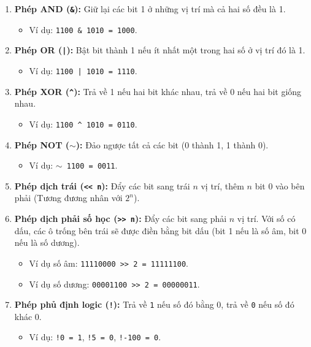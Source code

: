 \documentclass[12pt, a4paper]{article}
\begin{document}
\begin{enumerate}
    \item \textbf{Phép AND (\texttt{\&}):} Giữ lại các bit 1 ở những vị trí mà cả hai số đều là 1.
    \begin{itemize}
        \item Ví dụ: \texttt{1100 \& 1010 = 1000}.
    \end{itemize}
    \item \textbf{Phép OR (\texttt{|}):} Bật bit thành 1 nếu ít nhất một trong hai số ở vị trí đó là 1.
    \begin{itemize}
        \item Ví dụ: \texttt{1100 | 1010 = 1110}.
    \end{itemize}
    \item \textbf{Phép XOR (\texttt{\textasciicircum}):} Trả về 1 nếu hai bit khác nhau, trả về 0 nếu hai bit giống nhau.
    \begin{itemize}
        \item Ví dụ: \texttt{1100 \textasciicircum\ 1010 = 0110}.
    \end{itemize}
    \item \textbf{Phép NOT (\texttt{\(\sim\)}):} Đảo ngược tất cả các bit (0 thành 1, 1 thành 0).
    \begin{itemize}
        \item Ví dụ: \texttt{\(\sim\) 1100 = 0011}.
    \end{itemize}
    \item \textbf{Phép dịch trái (\texttt{<< n}):} Đẩy các bit sang trái $n$ vị trí, thêm $n$ bit 0 vào bên phải (Tương đương nhân với $2^n$).
    \item \textbf{Phép dịch phải số học (\texttt{>> n}):} Đẩy các bit sang phải $n$ vị trí. Với số có dấu, các ô trống bên trái sẽ được điền bằng bit dấu (bit 1 nếu là số âm, bit 0 nếu là số dương).
    \begin{itemize}
        \item Ví dụ số âm: \texttt{11110000 >> 2 = 11111100}.
        \item Ví dụ số dương: \texttt{00001100 >> 2 = 00000011}.
    \end{itemize}
    \item \textbf{Phép phủ định logic (\texttt{!}):} Trả về \texttt{1} nếu số đó bằng 0, trả về \texttt{0} nếu số đó khác 0.
    \begin{itemize}
        \item Ví dụ: \texttt{!0 = 1}, \texttt{!5 = 0}, \texttt{!-100 = 0}.
    \end{itemize}

\end{enumerate}
\end{document}

